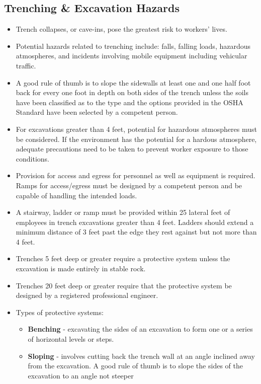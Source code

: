 \subsection{Trenching \& Excavation Hazards}
\begin{itemize}
\item Trench collapses, or cave-ins, pose the greatest risk to workers’ lives.
\item Potential hazards related to trenching include: falls, falling loads, hazardous atmospheres, and incidents involving mobile equipment including vehicular traffic.
\item A good rule of thumb is to slope the sidewalls at least one and one half foot back for every one foot in depth on both sides of the trench unless the soils have been classified as to the type and the options provided in the OSHA Standard have been selected by a competent person.
\item For excavations greater than 4 feet, potential for hazardous atmospheres must be considered. If the environment has the potential for a hardous atmosphere, adequate precautions need to be taken to prevent worker exposure to those conditions.
\item Provision for access and egress for personnel as well as equipment is required. Ramps for access/egress must be designed by a competent person and be capable of handling the intended loads.
\item A stairway, ladder or ramp must be provided within 25 lateral feet of employees in trench excavations greater than 4 feet.  Ladders should extend a minimum distance of 3 feet past the edge they rest against but not more than 4 feet. 
\item Trenches 5 feet deep or greater require a protective system unless the excavation
is made entirely in stable rock. 
\item Trenches 20 feet deep or greater require that the protective system be designed
by a registered professional engineer.
\item Types of protective systems:
\begin{itemize}
\item \textbf{Benching} - excavating the sides of an excavation to form one or a series of horizontal levels or steps.
\item \textbf{Sloping} - involves cutting back the trench wall at an angle inclined away from the excavation.  A good rule of thumb is to slope the sides of the excavation to an angle not steeper

\end{itemize}
\end{itemize}
